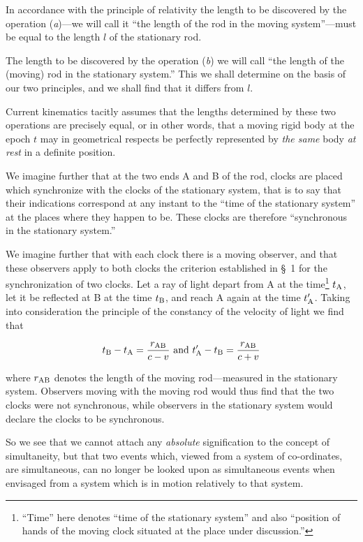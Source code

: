 \documentclass{article}
\begin{document}
In accordance with the principle of relativity the length to be
discovered by the operation ({\em a})---we will call it ``the
length of the rod in the moving system''---must be equal to the
length $l$ of the stationary rod.

The length to be discovered by the operation ({\em b}) we will call ``the
length of the (moving) rod in the stationary system.'' This we shall
determine on the basis of our two principles, and we shall find that
it differs from $l$.

Current kinematics tacitly assumes that the lengths determined
by these two operations are precisely equal, or in other words,
that a moving rigid body at the epoch $t$ may in geometrical
respects be perfectly represented by {\em the same} body {\em at
rest} in a definite position.

We imagine further that at the two ends A and B of the rod, clocks are
placed which synchronize with the clocks of the stationary system,
that is to say that their indications correspond at any instant to the
``time of the stationary system'' at the places where they happen to
be.  These clocks are therefore ``synchronous in the stationary
system.''

We imagine further that with each clock there is a moving
observer, and that these observers apply to both clocks the
criterion established in \S\ 1 for the synchronization of two
clocks.  Let a ray of light depart from A at the
time\footnote{``Time'' here denotes ``time of the stationary
system'' and also ``position of hands of the moving clock situated
at the place under discussion.''} $t_{\rm A}$, let it be reflected at B at
the time $t_{\rm B}$, and reach A again at the time $t'_{\rm A}$. Taking into
consideration the principle of the constancy of the velocity of
light we find that

\[
t_{\rm B}-t_{\rm A}=\frac{r_{\rm AB}}{c-v}\ {\rm and}\ 
t'_{\rm A}-t_{\rm B}=\frac{r_{\rm AB}}{c+v}
\]

\noindent
where $r_{\rm AB}$ denotes the length of the moving rod---measured in the
stationary system.  Observers moving with the moving rod would thus
find that the two clocks were not synchronous, while observers in the
stationary system would declare the clocks to be synchronous.

So we see that we cannot attach any {\em absolute} signification to the
concept of simultaneity, but that two events which, viewed from a
system of co-ordinates, are simultaneous, can no longer be looked upon
as simultaneous events when
envisaged from a system which is in motion relatively to that system.
\end{document}
